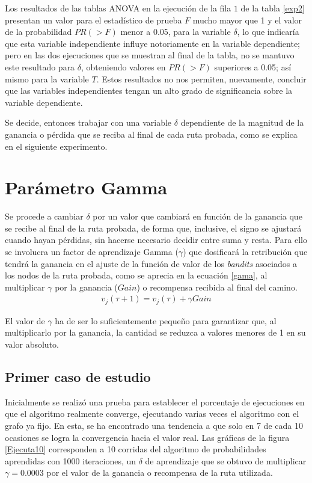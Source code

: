 Los resultados de las tablas ANOVA en la ejecución de la fila $1$ de la tabla \ref{exp2} presentan un valor para el estadístico de prueba $F$ mucho mayor que 1 y el valor de la probabilidad $PR(>F)$ menor a 0.05, para la variable $\delta$, lo que indicaría que esta variable independiente influye notoriamente en la variable dependiente; pero en las dos ejecuciones que se muestran al final de la tabla, no se mantuvo este resultado para $\delta$, obteniendo valores en $PR(>F)$ superiores a 0.05; así mismo para la variable $T$. Estos resultados no nos permiten, nuevamente, concluir que las variables independientes tengan un alto grado de significancia sobre la variable dependiente.

Se decide, entonces trabajar con una variable $\delta$ dependiente de la magnitud de la ganancia o pérdida que se reciba al final de cada ruta probada, como se explica en el siguiente experimento.

\section{Parámetro Gamma}

Se procede a cambiar $\delta$ por un valor que cambiará en función de la ganancia que se recibe al final de la ruta probada, de forma que, inclusive, el signo se ajustará cuando hayan pérdidas, sin hacerse necesario decidir entre suma y resta. Para ello se involucra un factor de aprendizaje Gamma ($\gamma$) que dosificará la retribución que tendrá la ganancia en el ajuste de la función de valor de los \textit{bandits} asociados a los nodos de la ruta probada, como se aprecia en la ecuación \ref{gama}, al multiplicar $\gamma$ por la ganancia ($Gain$) o recompensa recibida al final del camino.
\begin{eqnarray}
\label{gama}
v_j(\tau + 1) = v_j(\tau) + \gamma Gain
\end{eqnarray}

El valor de $\gamma$ ha de ser lo suficientemente pequeño para garantizar que, al multiplicarlo por la ganancia, la cantidad se reduzca a valores menores de 1 en su valor absoluto.

\subsection{Primer caso de estudio}

Inicialmente se realizó una prueba para establecer el porcentaje de ejecuciones en que el algoritmo realmente converge, ejecutando varias veces el algoritmo con el grafo ya fijo. En esta, se ha encontrado una tendencia a que solo en 7 de cada 10 ocasiones se logra la convergencia hacia el valor real. Las gráficas de la figura \ref{Ejecuta10} corresponden a 10 corridas del algoritmo de probabilidades aprendidas con 1000 iteraciones, un $\delta$ de aprendizaje que se obtuvo de multiplicar $\gamma = 0.0003$ por el valor de la ganancia o recompensa de la ruta utilizada.

